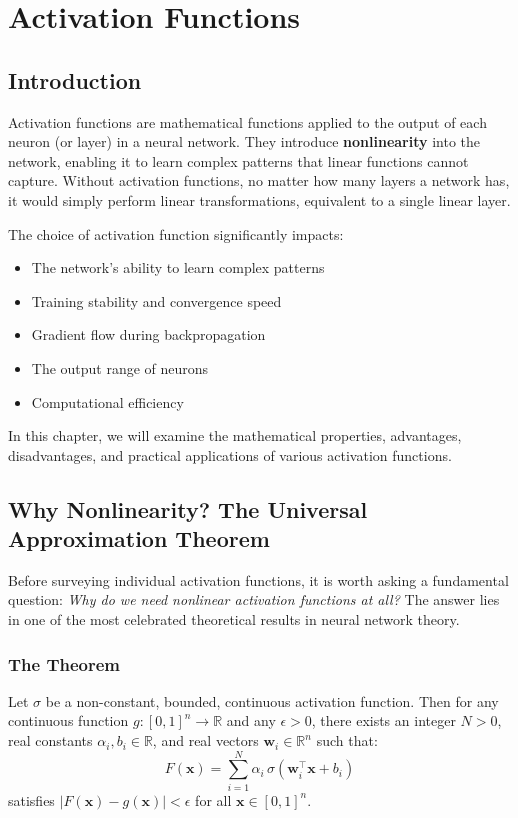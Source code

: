 ﻿\clearpage
\cleardoublepage

\chapter{Activation Functions}

\section{Introduction}

Activation functions are mathematical functions applied to the output of each neuron (or layer) in a neural network. They introduce \textbf{nonlinearity} into the network, enabling it to learn complex patterns that linear functions cannot capture. Without activation functions, no matter how many layers a network has, it would simply perform linear transformations, equivalent to a single linear layer.

The choice of activation function significantly impacts:
\begin{itemize}
    \item The network's ability to learn complex patterns
    \item Training stability and convergence speed
    \item Gradient flow during backpropagation
    \item The output range of neurons
    \item Computational efficiency
\end{itemize}

In this chapter, we will examine the mathematical properties, advantages, disadvantages, and practical applications of various activation functions.

\section{Why Nonlinearity? The Universal Approximation Theorem}

Before surveying individual activation functions, it is worth asking a fundamental question: \emph{Why do we need nonlinear activation functions at all?} The answer lies in one of the most celebrated theoretical results in neural network theory.

\subsection{The Theorem}

\begin{theorem}
Let $\sigma$ be a non-constant, bounded, continuous activation function. Then for any continuous function $g: [0,1]^n \to \mathbb{R}$ and any $\epsilon > 0$, there exists an integer $N > 0$, real constants $\alpha_i, b_i \in \mathbb{R}$, and real vectors $\mathbf{w}_i \in \mathbb{R}^n$ such that:
\begin{equation}
F(\mathbf{x}) = \sum_{i=1}^{N} \alpha_i \, \sigma\left(\mathbf{w}_i^\top \mathbf{x} + b_i\right)
\end{equation}
satisfies $|F(\mathbf{x}) - g(\mathbf{x})| < \epsilon$ for all $\mathbf{x} \in [0,1]^n$.
\end{theorem}

